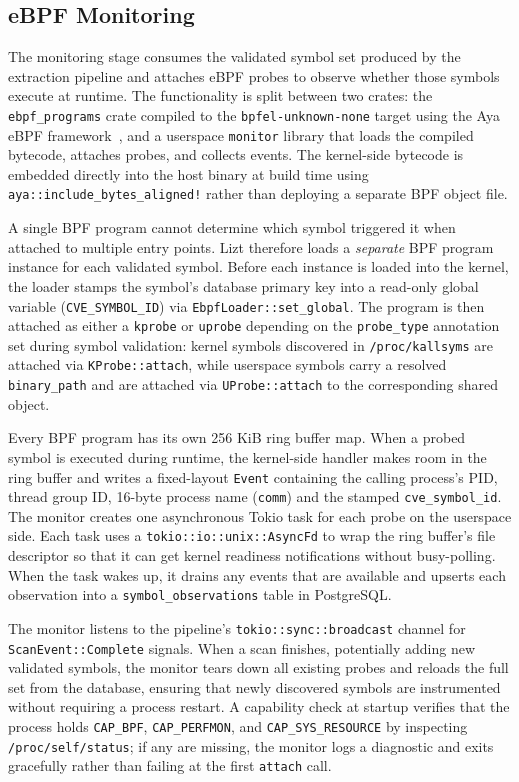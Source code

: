 \documentclass[conference]{IEEEtran}
\begin{document}
\subsection{eBPF Monitoring}
The monitoring stage consumes the validated symbol set produced by the extraction pipeline and attaches eBPF probes to observe whether those symbols execute at runtime. The functionality is split between two crates: the \texttt{ebpf\_programs} crate compiled to the \texttt{bpfel-unknown-none} target using the Aya eBPF framework~\cite{aya}, and a userspace \texttt{monitor} library that loads the compiled bytecode, attaches probes, and collects events. The kernel-side bytecode is embedded directly into the host binary at build time using \texttt{aya::include\_bytes\_aligned!} rather than deploying a separate BPF object file.

A single BPF program cannot determine which symbol triggered it when attached to multiple entry points. Lizt therefore loads a \emph{separate} BPF program instance for each validated symbol. Before each instance is loaded into the kernel, the loader stamps the symbol's database primary key into a read-only global variable (\texttt{CVE\_SYMBOL\_ID}) via \texttt{EbpfLoader::set\_global}. The program is then attached as either a \texttt{kprobe} or \texttt{uprobe} depending on the \texttt{probe\_type} annotation set during symbol validation: kernel symbols discovered in \texttt{/proc/kallsyms} are attached via \texttt{KProbe::attach}, while userspace symbols carry a resolved \texttt{binary\_path} and are attached via \texttt{UProbe::attach} to the corresponding shared object.

Every BPF program has its own 256 KiB ring buffer map. When a probed symbol is executed during runtime, the kernel-side handler makes room in the ring buffer and writes a fixed-layout \texttt{Event} containing the calling process's PID, thread group ID, 16-byte process name (\texttt{comm}) and the stamped \texttt{cve\_symbol\_id}. The monitor creates one asynchronous Tokio task for each probe on the userspace side. Each task uses a \texttt{tokio::io::unix::AsyncFd} to wrap the ring buffer's file descriptor so that it can get kernel readiness notifications without busy-polling. When the task wakes up, it drains any events that are available and upserts each observation into a \texttt{symbol\_observations} table in PostgreSQL.

The monitor listens to the pipeline's \texttt{tokio::sync::broadcast} channel for \texttt{ScanEvent::Complete} signals. When a scan finishes, potentially adding new validated symbols, the monitor tears down all existing probes and reloads the full set from the database, ensuring that newly discovered symbols are instrumented without requiring a process restart. A capability check at startup verifies that the process holds \texttt{CAP\_BPF}, \texttt{CAP\_PERFMON}, and \texttt{CAP\_SYS\_RESOURCE} by inspecting \texttt{/proc/self/status}; if any are missing, the monitor logs a diagnostic and exits gracefully rather than failing at the first \texttt{attach} call.
\end{document}
